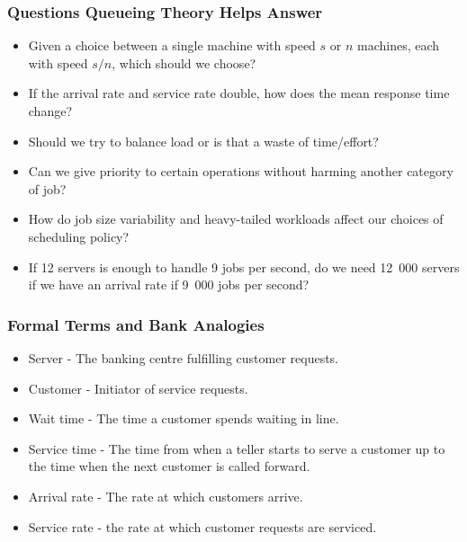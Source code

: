 \begin{frame}
\frametitle{Questions Queueing Theory Helps Answer}

\begin{itemize}
 \item Given a choice between a single machine with speed $s$ or $n$ machines, each with speed $s/n$, which should we choose?
 \item If the arrival rate and service rate double, how does the mean response time change?
 \item Should we try to balance load or is that a waste of time/effort?
 \item Can we give priority to certain operations without harming another category of job?
 \item How do job size variability and heavy-tailed workloads affect our choices of scheduling policy?
 \item If 12 servers is enough to handle 9 jobs per second, do we need 12~000 servers if we have an arrival rate if 9~000 jobs per second?
\end{itemize}

\end{frame}



\begin{frame}
\frametitle{Formal Terms and Bank Analogies}

\begin{itemize}
	\item Server - The banking centre fulfilling customer requests.
	\item Customer - Initiator of service requests.
	\item Wait time - The time a customer spends waiting in line.
	\item Service time - The time from when a teller starts to serve a customer up to the time when the next customer is called forward.
	\item Arrival rate - The rate at which customers arrive.
	\item Service rate - the rate at which customer requests are serviced.

\end{itemize}

\end{frame}




